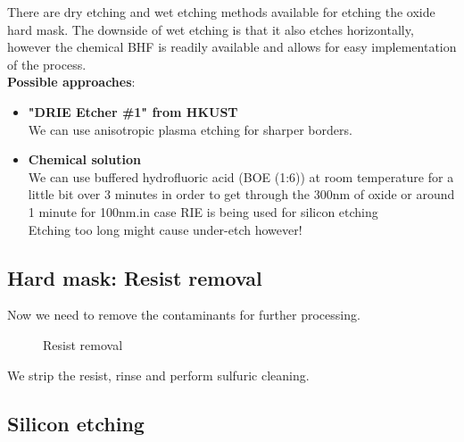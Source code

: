 There are dry etching and wet etching methods available for etching the oxide hard mask. The downside of wet etching is that it also etches horizontally, however the chemical BHF is readily available and allows for easy implementation of the process.\\

\textbf{Possible approaches}:
\begin{itemize}
	\item \textbf{"DRIE Etcher \#1" from HKUST} \\
	We can use anisotropic plasma etching for sharper borders.
	\item \textbf{Chemical solution} \\
	We can use buffered hydrofluoric acid (BOE (1:6)) at room temperature for a little bit over 3 minutes in order to get through the 300nm of oxide or around 1 minute for 100nm.in case RIE is being used for silicon etching\\
	Etching too long might cause under-etch however!
\end{itemize}

\subsection{Hard mask: Resist removal}
Now we need to remove the contaminants for further processing.

\begin{figure}[H]
	\centering
	\begin{tikzpicture}[node distance = 3cm, auto, thick,scale=\CrossSectionOnly, every node/.style={transform shape}]
		
	\end{tikzpicture}
	\drawStepArrow{}
	\begin{tikzpicture}[node distance = 3cm, auto, thick,scale=\CrossSectionOnly, every node/.style={transform shape}]
		
	\end{tikzpicture}
	\caption{Resist removal}
\end{figure}

We strip the resist, rinse and perform sulfuric cleaning.

\newpage

\subsection{Silicon etching}\label{sti_trench_etch}

